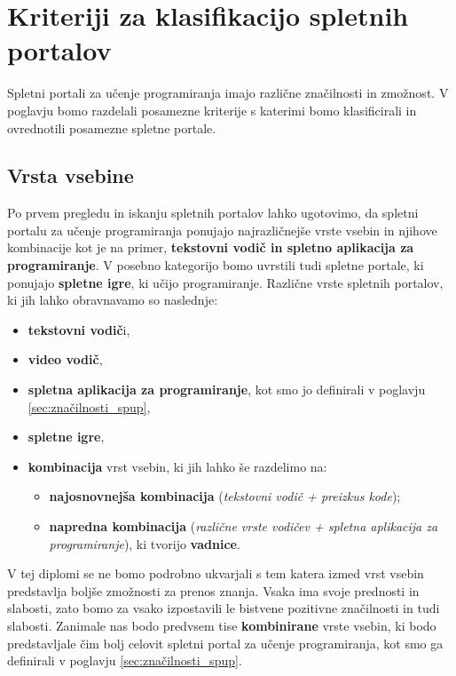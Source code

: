\section{Kriteriji za klasifikacijo spletnih portalov}
\label{sec:kriteriji_za_klasifikacijo_spletnih_portalov}

Spletni portali za učenje programiranja imajo različne značilnosti in
zmožnost. V poglavju bomo razdelali posamezne kriterije s katerimi
bomo klasificirali in ovrednotili posamezne spletne portale.

\subsection{Vrsta vsebine}
\label{sec:Razvrstitev_spletnih_portalov}

Po prvem pregledu in iskanju spletnih portalov lahko ugotovimo, da
spletni portalu za učenje programiranja ponujajo najrazličnejše vrste
vsebin in njihove kombinacije kot je na primer, \textbf{tekstovni
  vodič in spletno aplikacija za programiranje}. V posebno kategorijo
bomo uvrstili tudi spletne portale, ki ponujajo \textbf{spletne igre},
ki učijo programiranje. Različne vrste spletnih portalov, ki jih lahko
obravnavamo so naslednje:

\begin{itemize}
\tightlist
\item \textbf{tekstovni vodič}i,
\item \textbf{video vodič},
\item \textbf{spletna aplikacija za programiranje}, kot smo jo
  definirali v poglavju \ref{sec:značilnosti_spup},
\item \textbf{spletne igre},
\item \textbf{kombinacija} vrst vsebin, ki jih lahko še razdelimo na:
  \begin{itemize}
    \tightlist
  \item \textbf{najosnovnejša kombinacija} (\emph{tekstovni vodič + preizkus kode});
  \item \textbf{napredna kombinacija} (\emph{različne vrste vodičev +
      spletna aplikacija za programiranje}), ki tvorijo \textbf{vadnice}.
  \end{itemize}
\end{itemize}

V tej diplomi se ne bomo podrobno ukvarjali s tem katera izmed vrst
vsebin predstavlja boljše zmožnosti za prenos znanja. Vsaka ima svoje
prednosti in slabosti, zato bomo za vsako izpostavili le bistvene
pozitivne značilnosti in tudi slabosti. Zanimale nas bodo predvsem
tise \textbf{kombinirane} vrste vsebin, ki bodo predstavljale čim bolj
celovit spletni portal za učenje programiranja, kot smo ga definirali
v poglavju \ref{sec:značilnosti_spup}.

